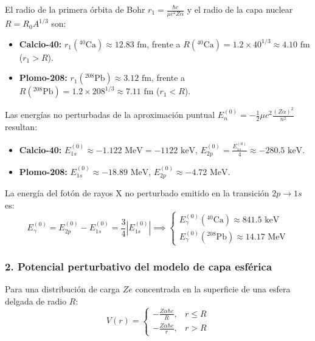 \begin{problema}
El radio de la primera órbita de Bohr $r_1 = \frac{\hbar c}{\mu c^2 Z \alpha}$ y el radio de la capa nuclear $R = R_0 A^{1/3}$ son:
\begin{itemize}
    \item \textbf{Calcio-40:} $r_1({}^{40}\text{Ca}) \approx 12.83\text{ fm}$, frente a $R({}^{40}\text{Ca}) = 1.2 \times 40^{1/3} \approx 4.10\text{ fm}$ ($r_1 > R$).
    \item \textbf{Plomo-208:} $r_1({}^{208}\text{Pb}) \approx 3.12\text{ fm}$, frente a $R({}^{208}\text{Pb}) = 1.2 \times 208^{1/3} \approx 7.11\text{ fm}$ ($r_1 < R$).
\end{itemize}

Las energías no perturbadas de la aproximación puntual $E_n^{(0)} = -\frac{1}{2} \mu c^2 \frac{(Z\alpha)^2}{n^2}$ resultan:
\begin{itemize}
    \item \textbf{Calcio-40:} $E_{1s}^{(0)} \approx -1.122\text{ MeV} = -1122\text{ keV}$, \quad $E_{2p}^{(0)} = \frac{E_{1s}^{(0)}}{4} \approx -280.5\text{ keV}$.
    \item \textbf{Plomo-208:} $E_{1s}^{(0)} \approx -18.89\text{ MeV}$, \quad $E_{2p}^{(0)} \approx -4.72\text{ MeV}$.
\end{itemize}

La energía del fotón de rayos X no perturbado emitido en la transición $2p \to 1s$ es:
\begin{equation*}
E_\gamma^{(0)} = E_{2p}^{(0)} - E_{1s}^{(0)} = \frac{3}{4} |E_{1s}^{(0)}| \implies 
\begin{cases}
E_\gamma^{(0)}({}^{40}\text{Ca}) \approx 841.5\text{ keV} \\
E_\gamma^{(0)}({}^{208}\text{Pb}) \approx 14.17\text{ MeV}
\end{cases}
\end{equation*}

\subsubsection*{2. Potencial perturbativo del modelo de capa esférica}

Para una distribución de carga $Ze$ concentrada en la superficie de una esfera delgada de radio $R$:
\begin{equation*}
V(r) = 
\begin{cases}
-\frac{Z\alpha\hbar c}{R}, & r \le R \\
-\frac{Z\alpha\hbar c}{r}, & r > R
\end{cases}
\end{equation*}


\end{problema}
